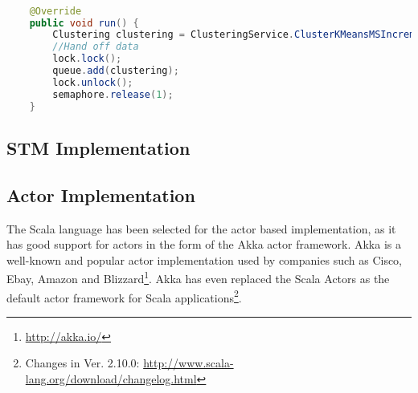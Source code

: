 \begin{lstlisting}[float,label=lst:tl_implementation,
  caption={\ac{TL} Implementation},
  language=Java,  
  showspaces=false,
  showtabs=false,
  breaklines=true,
  showstringspaces=false,
  breakatwhitespace=true,
  commentstyle=\color{greencomments},
  keywordstyle=\color{bluekeywords},
  stringstyle=\color{redstrings}]  % Start your code-block

    @Override
    public void run() {
        Clustering clustering = ClusteringService.ClusterKMeansMSIncremental(data, means);
        //Hand off data
        lock.lock();
        queue.add(clustering);
        lock.unlock();
        semaphore.release(1);
    }  
\end{lstlisting}

\subsection{\ac{STM} Implementation}

\subsection{Actor Implementation}
The Scala language has been selected for the actor based implementation, as it has good support for actors in the form of the Akka actor framework. Akka is a well-known and popular actor implementation used by companies such as Cisco, Ebay, Amazon and Blizzard\footnote{\url{http://akka.io/}}. Akka has even replaced the Scala Actors as the default actor framework for Scala applications\footnote{Changes in Ver. 2.10.0: \url{http://www.scala-lang.org/download/changelog.html}}.

	

